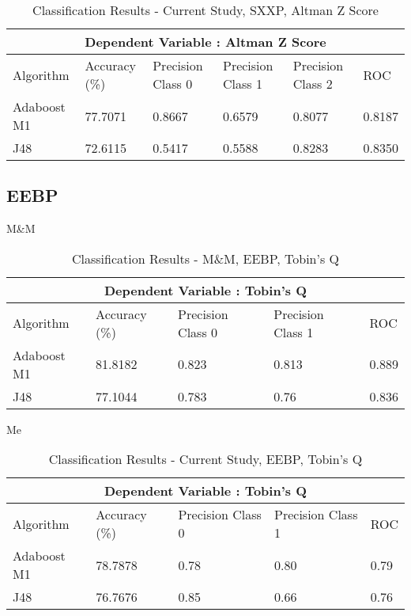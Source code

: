 \begin{table}[h!]
\centering
\begin{tabular}{ |p{2.5cm}||p{2.5cm}|p{2.5cm}|p{2.5cm}|p{2.5cm}|p{1.5cm}|  }
 \hline
 \multicolumn{6}{|c|}{Dependent Variable : Altman Z Score} \\
 \hline
 Algorithm & Accuracy (\%) & Precision Class 0 & Precision Class 1 & Precision Class 2 & ROC \\
 \hline
 Adaboost M1  &  77.7071     & 0.8667 &  0.6579 & 0.8077 & 0.8187  \\
 J48  & 72.6115  & 0.5417 &  0.5588 & 0.8283 & 0.8350  \\
 \hline
\end{tabular}
\caption{Classification Results  - Current Study, SXXP, Altman Z Score}
\end{table}


\clearpage
\subsection{EEBP}
{M\&M}
\begin{table}[h!]
\centering
\begin{tabular}{ |p{2.5cm}||p{2.5cm}|p{2.5cm}|p{2.5cm}|p{1.5cm}|  }
 \hline
 \multicolumn{5}{|c|}{Dependent Variable : Tobin's Q} \\
 \hline
 Algorithm & Accuracy (\%) & Precision Class 0 & Precision Class 1 & ROC \\
 \hline
 Adaboost M1  &  81.8182     & 0.823 &  0.813 & 0.889  \\
 J48  & 77.1044  & 0.783 &  0.76 & 0.836  \\
 \hline
 \end{tabular}
\caption{Classification Results  - M\&M, EEBP, Tobin's Q}
\end{table}

{Me}
\begin{table}[h!]
\centering
\begin{tabular}{ |p{2.5cm}||p{2.5cm}|p{2.5cm}|p{2.5cm}|p{1.5cm}|  }
 \hline
 \multicolumn{5}{|c|}{Dependent Variable : Tobin's Q} \\
 \hline
 Algorithm & Accuracy (\%) & Precision Class 0 & Precision Class 1 & ROC \\
 \hline
 Adaboost M1  &  78.7878     & 0.78 &  0.80 & 0.79  \\
 J48  & 76.7676  & 0.85 &  0.66 & 0.76  \\
 \hline
 \end{tabular}
\caption{Classification Results  - Current Study, EEBP, Tobin's Q}
\end{table}
\clearpage

